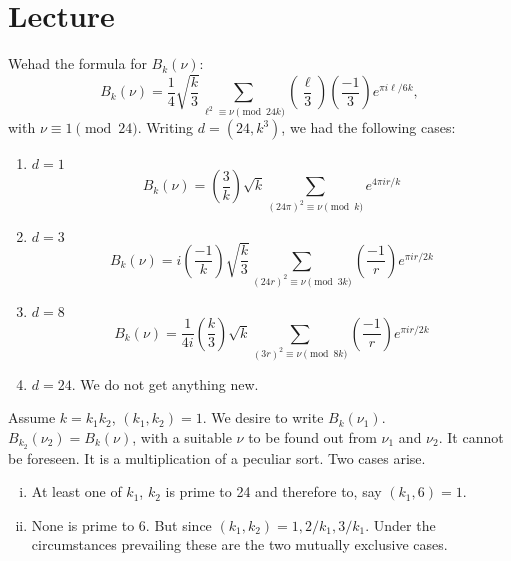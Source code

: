 \chapter{Lecture}\label{part3:lec26} %

We\pageoriginale had the formula for $B_k (\nu)$:
$$
B_k (\nu) = \frac{1}{4} \sqrt{\frac{k}{3}} \sum_{\ell^2 \equiv \nu
  \pmod{24 k}} \left( \frac{\ell}{3}\right) \left( \frac{-1}{3}\right)
e^{\pi i \ell/6k},
$$
with $\nu \equiv 1  \pmod{24}$. Writing $d= (24, k^3)$, we had the
following cases:

\begin{enumerate}[1)]
\item $d=1$
  $$
  B_k (\nu) = \left( \frac{3}{k}\right) \sqrt{k} \sum_{(24 \pi)^2
    \equiv \nu \pmod{k}} e^{4 \pi i r/k}
  $$
\item $d=3$
  $$
  B_k (\nu) = i \left( \frac{-1}{k}\right) \sqrt{\frac{k}{3}}
  \sum_{(24 r)^2\equiv \nu \pmod{3k}} \left( \frac{-1}{r}\right)
  e^{\pi i r/2k}
  $$
\item $d=8$
  $$
  B_k (\nu) = \frac{1}{4i} \left( \frac{k}{3}\right) \sqrt{k}
  \sum_{(3r)^2 \equiv \nu \pmod{8k}} \left( \frac{-1}{r}\right) e^{\pi
  i r/2k}
  $$
\item $d=24$. We do not get anything new.
\end{enumerate}

Assume $k= k_1 k_2$, $(k_1, k_2)=1$. We desire to write $B_k
(\nu_1)$. $B_{k_2}(\nu_2)= B_k (\nu)$, with a suitable $\nu$ to be
found out from $\nu_1$ and $\nu_2$. It cannot be foreseen. It is a
multiplication of a peculiar sort. Two cases arise. 
\begin{enumerate}[(i)]
\item  At least one
    of $k_1$, $k_2$ is prime to 24 and therefore to, say
    $(k_1, 6)=1$.
\item None is prime to 6. But since $(k_1, k_2)= 1, 2/k_1,
  3/k_1$. Under the circumstances prevailing these are the two
  mutually exclusive cases.
\end{enumerate}


